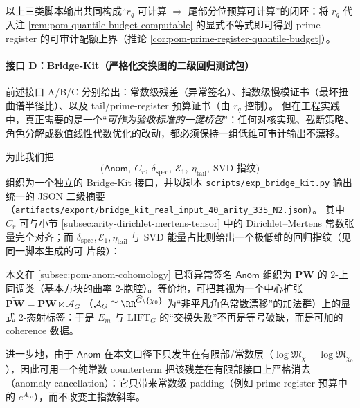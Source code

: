 以上三类脚本输出共同构成“\(r_q\) 可计算 \(\Rightarrow\) 尾部分位预算可计算”的闭环：将 \(r_q\) 代入注 \ref{rem:pom-quantile-budget-computable} 的显式不等式即可得到 prime-register 的可审计配额上界（推论 \ref{cor:pom-prime-register-quantile-budget}）。

\paragraph{接口 D：Bridge-Kit（严格化交换图的二级回归测试包）}
前述接口 A/B/C 分别给出：常数级残差（异常签名）、指数级慢模证书（最坏扭曲谱半径比）、以及 tail/prime-register 预算证书（由 \(r_q\) 控制）。
但在工程实践中，真正需要的是一个“\emph{可作为验收标准的一键桥包}”：任何对核实现、截断策略、角色分解或数值线性代数优化的改动，都必须保持一组低维可审计输出不漂移。
\par
为此我们把
\[
\bigl(\mathsf{Anom},\ C_r,\ \delta_{\mathrm{spec}},\ \mathcal{E}_1,\ \eta_{\mathrm{tail}},\ \text{SVD 指纹}\bigr)
\]
组织为一个独立的 Bridge-Kit 接口，并以脚本
\texttt{scripts/exp\_bridge\_kit.py}
输出统一的 JSON 二级摘要（\texttt{artifacts/export/bridge\_kit\_real\_input\_40\_arity\_335\_N2.json}）。
其中 \(C_r\) 可与小节 \ref{subsec:arity-dirichlet-mertens-tensor} 中的 Dirichlet--Mertens 常数张量完全对齐；而 \(\delta_{\mathrm{spec}},\mathcal{E}_1,\eta_{\mathrm{tail}}\) 与 SVD 能量占比则给出一个极低维的回归指纹（见同一脚本生成的可 \verb|| 片段）：


\begin{remark}\label{rem:pom-bridge-kit-strictification}
本文在 \ref{subsec:pom-anom-cohomology} 已将异常签名 \(\mathsf{Anom}\) 组织为 \(\mathbf{PW}\) 的 \(2\)-上同调类（基本方块的曲率 \(2\)-胞腔）。等价地，可把其视为一个中心扩张
\(
\widetilde{\mathbf{PW}}=\mathbf{PW}\ltimes \mathcal{A}_G
\)
（\(\mathcal{A}_G\cong\RR^{\widehat G\setminus\{\chi_0\}}\) 为“非平凡角色常数漂移”的加法群）上的显式 \(2\)-态射标签：于是 \(E_m\) 与 \(\mathrm{LIFT}_G\) 的“交换失败”不再是等号破缺，而是可加的 coherence 数据。
\par
进一步地，由于 \(\mathsf{Anom}\) 在本文口径下只发生在有限部/常数层（\(\log\mathfrak{M}_\chi-\log\mathfrak{M}_{\chi_0}\)），因此可用一个纯常数 counterterm 把该残差在有限部接口上严格消去（anomaly cancellation）：它只带来常数级 padding（例如 prime-register 预算中的 \(e^{A_\infty}\)），而不改变主指数斜率。
\end{remark}

